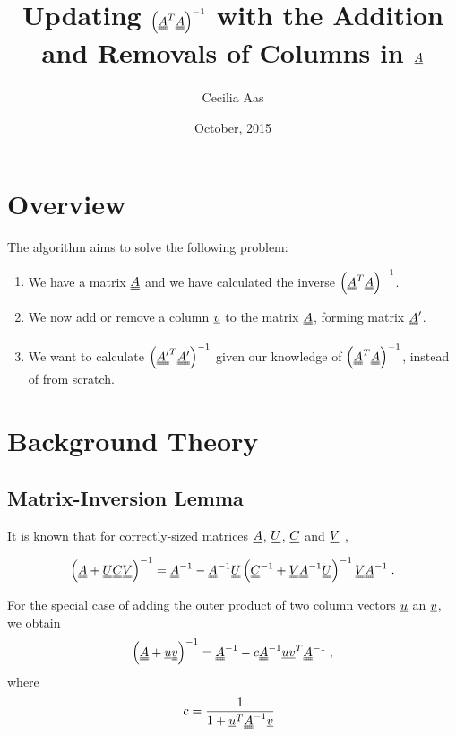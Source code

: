 \documentclass[11pt]{article} %
\title{Updating $\left(\uuline{A}^T \uuline{A}\right)^{-1}$ with the Addition and Removals of Columns in $\uuline{A}$}
\author{Cecilia Aas}
\date{October, 2015}
\begin{document}
\maketitle
\section{Overview}
The algorithm aims to solve the following problem:\\

\begin{enumerate}
\item We have a matrix $\uuline{A}$ and we have calculated the inverse $\left(\uuline{A}^T\uuline{A}\right)^{-1}$.
\item We now add or remove a column $\uline{v}$ to the matrix $\uuline{A}$, forming matrix $\uuline{A}'$.
\item We want to calculate $\left(\uuline{A'}^T \uuline{A'}\right)^{-1}$ given our knowledge of $\left(\uuline{A}^T\uuline{A}\right)^{-1}$, instead of from scratch.
\end{enumerate}

\section{Background Theory}

\subsection{Matrix-Inversion Lemma}
It is known that for correctly-sized matrices $\uuline{A}$, $\uuline{U}$, $\uuline{C}$ and $\uuline{V}$ ,
\begin{equation}
\left(\uuline{A} + \uuline{U}\uuline{C}\uuline{V}\right)^{-1} = \uuline{A}^{-1} - \uuline{A}^{-1}\uuline{U} \left(\uuline{C}^{-1} + \uuline{V} \uuline{A}^{-1} \uuline{U}\right)^{-1}\uuline{V} \uuline{A}^{-1} \; .
\end{equation}

For the special case of adding the outer product of two column vectors $\uline{u}$ an $\uline{v}$, we obtain
\begin{equation}
\left(\uuline{A} + \uline{u}\uuline{v} \right)^{-1} = \uuline{A}^{-1} - c\uuline{A}^{-1}\uline{u} \uline{v}^T \uuline{A}^{-1} \; ,
\end{equation}
where
\begin{equation}
c = \frac{1}{1 + \uline{u}^T \uuline{A}^{-1}\uline{v}} \; .
\end{equation}
\end{document}
